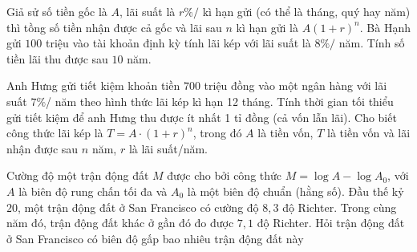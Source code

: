 \begin{ex}%
	Giả sử số tiền gốc là $A$, lãi suất là $r \% /$ kì hạn gửi (có thể là tháng, quý hay năm) thì tồng số tiền nhận được cả gốc và lãi sau $n$  kì hạn gửi là $A(1+r)^n$. Bà Hạnh gửi $100$ triệu vào tài khoản định kỳ tính lãi kép với lãi suất là $8 \% /$ năm. Tính số tiền lãi thu được sau $10$ năm.
\end{ex}

\begin{ex}%
	Anh Hưng gửi tiết kiệm khoản tiền $700$ triệu đồng vào một ngân hàng với lãi suất $7\%$/ năm theo hình thức lãi kép kì hạn 12 tháng. Tính thời gian tối thiểu gửi tiết kiệm để anh Hưng thu được ít nhất 1 tỉ  đồng (cả vốn lẫn lãi). Cho biết công thức lãi kép là $ T=A\cdot(1+r)^n $, trong đó $ A $ là tiền vốn, $ T $ là tiền vốn và lãi nhận được sau $ n $ năm, $ r $ là lãi suất/năm.
\end{ex}

\begin{ex}%
	Cường độ một trận động đất $M$ được cho bởi công thức $M=\log A-\log A_0$, với $A$ là biên độ rung chấn tối đa và $A_0$ là một biên độ chuẩn (hằng số). Đầu thế kỷ $20$, một trận động đất ở San Francisco có cường độ $8{,}3$ độ Richter. Trong cùng năm đó, trận động đất khác ở gần đó đo được $7{,}1$ độ  Richter. Hỏi trận động đất ở San Francisco có biên độ gấp bao nhiêu trận động đất này
\end{ex}

